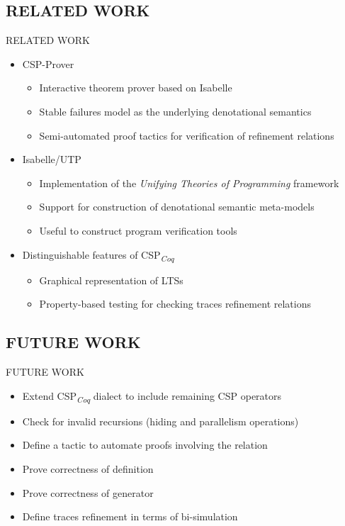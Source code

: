 \documentclass[t]{beamer}
\newcommand{\CSPcoq}{CSP\textsubscript{\textit{Coq}}}
\begin{document}
\subsection{RELATED WORK}

\begin{frame}{RELATED WORK}
	\begin{itemize}
		\item CSP-Prover
		\begin{itemize}
			\item Interactive theorem prover based on Isabelle
			\item Stable failures model as the underlying denotational semantics
			\item Semi-automated proof tactics for verification of refinement relations
		\end{itemize}
		\item Isabelle/UTP
		\begin{itemize}
			\item Implementation of the \emph{Unifying Theories of Programming} framework
			\item Support for construction of denotational semantic meta-models
			\item Useful to construct program verification tools
		\end{itemize}
		\item Distinguishable features of \CSPcoq{}
		\begin{itemize}
			\item Graphical representation of LTSs
			\item Property-based testing for checking traces refinement relations
		\end{itemize}
	\end{itemize}
\end{frame}

\subsection{FUTURE WORK}

\begin{frame}{FUTURE WORK}
	\begin{itemize}
		\item Extend \CSPcoq{} dialect to include remaining CSP operators
		\item Check for invalid recursions (hiding and parallelism operations)
		\item Define a tactic to automate proofs involving the relation 
		\item Prove correctness of definition 
		\item Prove correctness of generator 
		\item Define traces refinement in terms of bi-simulation
	\end{itemize}
\end{frame}

\begin{frame}
	\titlepage
\end{frame}
\end{document}
